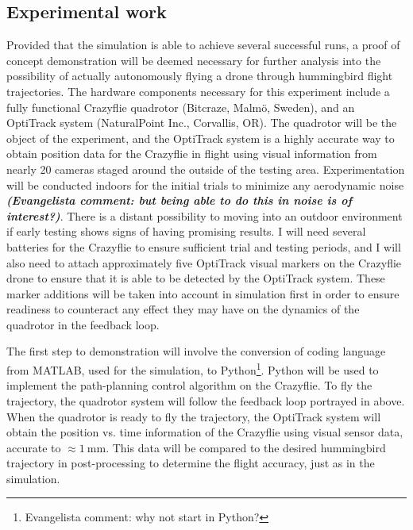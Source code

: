 \documentclass[onecolumn,10pt]{IEEEtran}
\newcommand{\MATLAB}{MATLAB}
\begin{document}
\subsection{Experimental work}
	Provided that the simulation is able to achieve several successful runs, a proof of concept demonstration will be deemed necessary for further analysis into the possibility of actually autonomously flying a drone through hummingbird flight trajectories. The hardware components necessary for this experiment include a fully functional Crazyflie quadrotor (Bitcraze, Malm\"{o}, Sweden), and an OptiTrack system (NaturalPoint Inc., Corvallis, OR). The quadrotor will be the object of the experiment, and the OptiTrack system is a highly accurate way to obtain position data for the Crazyflie in flight using visual information from nearly 20 cameras staged around the outside of the testing area. Experimentation will be conducted indoors for the initial trials to minimize any aerodynamic noise \emph{\textbf{(Evangelista comment: but being able to do this in noise is of interest?)}}. There is a distant possibility to moving into an outdoor environment if early testing shows signs of having promising results. I will need several batteries for the Crazyflie to ensure sufficient trial and testing periods, and I will also need to attach approximately five OptiTrack visual markers on the Crazyflie drone to ensure that it is able to be detected by the OptiTrack system. These marker additions will be taken into account in simulation first in order to ensure readiness to counteract any effect they may have on the dynamics of the quadrotor in the feedback loop.
	
The first step to demonstration will involve the conversion of coding language from \MATLAB, used for the simulation, to Python\footnote{Evangelista comment: why not start in Python?}. Python will be used to implement the path-planning control algorithm on the Crazyflie. To fly the trajectory, the quadrotor system will follow the feedback loop portrayed in  above. When the quadrotor is ready to fly the trajectory, the OptiTrack system will obtain the position vs. time information of the Crazyflie using visual sensor data, accurate to $\approx \SI{1}{\milli\meter}$. This data will be compared to the desired hummingbird trajectory in post-processing to determine the flight accuracy, just as in the simulation.

\end{document}
